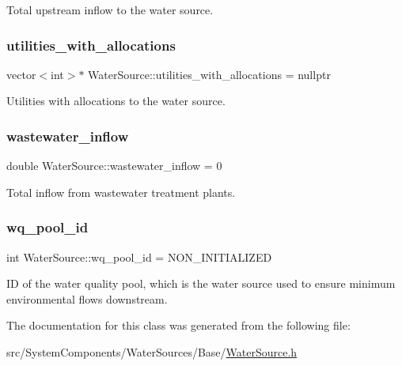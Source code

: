 Total upstream inflow to the water source. 

\mbox{\label{classWaterSource_ac345583fc2d0f7e1db31ee40244d7ace}} 
\subsubsection{\texorpdfstring{utilities\+\_\+with\+\_\+allocations}{utilities\_with\_allocations}}
{\footnotesize\ttfamily vector$<$int$>$$\ast$ Water\+Source\+::utilities\+\_\+with\+\_\+allocations = nullptr\hspace{0.3cm}{\ttfamily [protected]}}



Utilities with allocations to the water source. 

\mbox{\label{classWaterSource_aeb5a2d2d83383a70ca20f3e94635a9c7}} 
\subsubsection{\texorpdfstring{wastewater\+\_\+inflow}{wastewater\_inflow}}
{\footnotesize\ttfamily double Water\+Source\+::wastewater\+\_\+inflow = 0\hspace{0.3cm}{\ttfamily [protected]}}



Total inflow from wastewater treatment plants. 

\mbox{\label{classWaterSource_acef73d9b1675fb6db9ec39347514db6d}} 
\subsubsection{\texorpdfstring{wq\+\_\+pool\+\_\+id}{wq\_pool\_id}}
{\footnotesize\ttfamily int Water\+Source\+::wq\+\_\+pool\+\_\+id = N\+O\+N\+\_\+\+I\+N\+I\+T\+I\+A\+L\+I\+Z\+ED\hspace{0.3cm}{\ttfamily [protected]}}



ID of the water quality pool, which is the water source used to ensure minimum environmental flows downstream. 



The documentation for this class was generated from the following file\+:\begin{DoxyCompactItemize}
\item 
src/\+System\+Components/\+Water\+Sources/\+Base/\mbox{\hyperlink{WaterSource_8h}{Water\+Source.\+h}}\end{DoxyCompactItemize}
